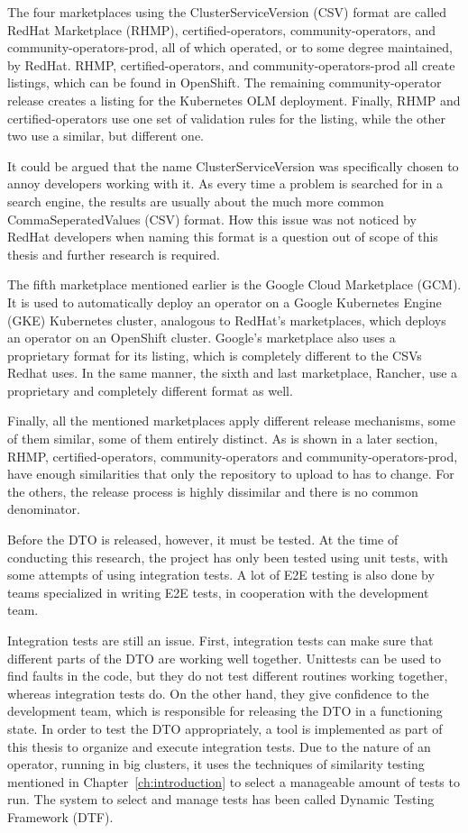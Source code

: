The four marketplaces using the ClusterServiceVersion (CSV) format are called RedHat Marketplace (RHMP), certified-operators, community-operators, and community-operators-prod, all of which operated, or to some degree maintained, by RedHat.
RHMP, certified-operators, and community-operators-prod all create listings, which can be found in OpenShift.
The remaining community-operator release creates a listing for the Kubernetes OLM deployment.
Finally, RHMP and certified-operators use one set of validation rules for the listing, while the other two use a similar, but different one.

It could be argued that the name ClusterServiceVersion was specifically chosen to annoy developers working with it.
As every time a problem is searched for in a search engine, the results are usually about the much more common CommaSeperatedValues (CSV) format.
How this issue was not noticed by RedHat developers when naming this format is a question out of scope of this thesis and further research is required.

The fifth marketplace mentioned earlier is the Google Cloud Marketplace (GCM).
It is used to automatically deploy an operator on a Google Kubernetes Engine (GKE) Kubernetes cluster, analogous to RedHat's marketplaces, which deploys an operator on an OpenShift cluster.
Google's marketplace also uses a proprietary format for its listing, which is completely different to the CSVs Redhat uses.
In the same manner, the sixth and last marketplace, Rancher, use a proprietary and completely different format as well.

Finally, all the mentioned marketplaces apply different release mechanisms, some of them similar, some of them entirely distinct.
As is shown in a later section, RHMP, certified-operators, community-operators and community-operators-prod, have enough similarities that only the repository to upload to has to change.
For the others, the release process is highly dissimilar and there is no common denominator.

Before the DTO is released, however, it must be tested.
At the time of conducting this research, the project has only been tested using unit tests, with some attempts of using integration tests.
A lot of E2E testing is also done by teams specialized in writing E2E tests, in cooperation with the development team.

Integration tests are still an issue.
First, integration tests can make sure that different parts of the DTO are working well together.
Unittests can be used to find faults in the code, but they do not test different routines working together, whereas integration tests do.
On the other hand, they give confidence to the development team, which is responsible for releasing the DTO in a functioning state.
In order to test the DTO appropriately, a tool is implemented as part of this thesis to organize and execute integration tests.
Due to the nature of an operator, running in big clusters, it uses the techniques of similarity testing mentioned in Chapter~\ref{ch:introduction} to select a manageable amount of tests to run.
The system to select and manage tests has been called Dynamic Testing Framework (DTF).

